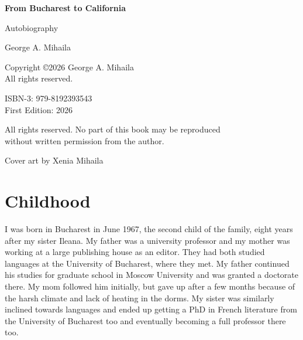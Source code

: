 \documentclass[12pt]{book}
\begin{document}
\thispagestyle{empty}  %

\vspace*{2in}  %

\begin{center}
  {\Huge \textbf{From Bucharest to California}}
  
  \vspace{0.5in}
  
  {\Large Autobiography}
  
  \vspace{1.5in}
  
  {\large George A. Mihaila}
\end{center}

\vfill  %

\begin{center}
  \small
  Copyright \copyright 2026 George A. Mihaila \\
  All rights reserved.
\end{center}

\newpage

\thispagestyle{empty}

\vspace*{\fill}


\begin{flushleft}
  \small
  ISBN-3: 979-8192393543 \\
  First Edition: 2026 \\

  \vspace{0.3in}

  All rights reserved. No part of this book may be reproduced \\
  without written permission from the author.

  \vspace{0.5in}

  Cover art by Xenia Mihaila
\end{flushleft}

\newpage
\tableofcontents
\newpage

\pagestyle{plain}


\section{Childhood}

I was born in Bucharest in June 1967, the second child of the family,
eight years after my sister Ileana. My father was a university professor
and my mother was working at a large publishing house as an editor. They
had both studied languages at the University of Bucharest, where they
met. My father continued his studies for graduate school in Moscow
University and was granted a doctorate there. My mom followed him
initially, but gave up after a few months because of the harsh climate
and lack of heating in the dorms. My sister was similarly inclined
towards languages and ended up getting a PhD in French literature from
the University of Bucharest too and eventually becoming a full professor
there too.
\end{document}
